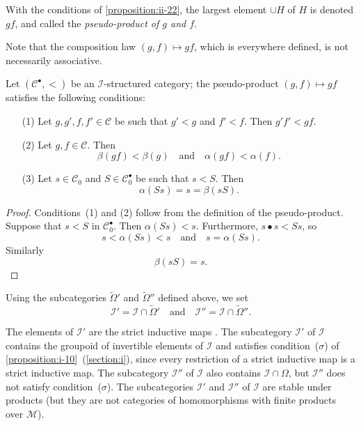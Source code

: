 \documentclass[a4paper,fleqn]{article}
\theoremstyle{plain}
\newenvironment{proposition}[1]
  {\renewcommand\theinnerproposition{#1}\innerproposition}
  {\endinnerproposition}
\theoremstyle{definition}
\newenvironment{definition}[1]
  {\renewcommand\theinnerdefinition{#1}\innerdefinition}
  {\endinnerdefinition}
\newcommand{\oldpage}[1]{{\marginpar{\footnotesize$\bigg\vert$\,\,\,\,\textit{p.~#1}}}}
\newcommand{\textand}{\quad\text{and}\quad}
\newcommand{\CC}{\mathcal{C}}
\newcommand{\MM}{\mathcal{M}}
\newcommand{\II}{\mathcal{I}}
\newcommand{\smallbullet}{\bullet}
\begin{document}
\begin{definition}{20}
\label{definition:ii-20}
  With the conditions of \cref{proposition:ii-22}, the largest element $\cup H$ of $H$ is denoted $gf$, and called the \emph{pseudo-product of $g$ and $f$}.
\end{definition}

Note that the composition law $(g,f)\mapsto gf$, which is everywhere defined, is not necessarily associative.

\begin{proposition}{23}
\label{proposition:ii-23}
  Let $(\CC^\smallbullet,<)$ be an $\II$-structured category;
  the pseudo-product $(g,f)\mapsto gf$ satisfies the following conditions:
  \begin{enumerate}
    \item[\normalfont(1)]
      Let $g,g',f,f'\in\CC$ be such that $g'<g$ and $f'<f$.
      Then $g'f'<gf$.
    \item[\normalfont(2)]
      Let $g,f\in\CC$.
      Then
      \[
        \beta(gf)<\beta(g)
        \textand
        \alpha(gf)<\alpha(f).
      \]
    \item[\normalfont(3)]
      \oldpage{405}
      Let $s\in\CC_0$ and $S\in\CC_0^\smallbullet$ be such that $s<S$.
      Then
      \[
        \alpha(Ss)
        = s
        = \beta(sS).
      \]
  \end{enumerate}
\end{proposition}

\begin{proof}
  Conditions~(1) and (2) follow from the definition of the pseudo-product.
  Suppose that $s<S$ in $\CC_0^\smallbullet$.
  Then $\alpha(Ss)<s$.
  Furthermore, $s\smallbullet s<Ss$, so
  \[
    s < \alpha(Ss) < s
    \textand
    s = \alpha(Ss).
  \]
  Similarly
  \[
    \beta(sS)
    = s.
  \]
\end{proof}

Using the subcategories $\widetilde{\Omega}'$ and $\widetilde{\Omega}''$ defined above, we set
\[
  \II' = \II\cap\widetilde{\Omega}'
  \textand
  \II'' = \II\cap\widetilde{\Omega}''.
\]

The elements of $\II'$ are the strict inductive maps \cite{3a}.
The subcategory $\II'$ of $\II$ contains the groupoid of invertible elements of $\II$ and satisfies condition~($\sigma$) of \cref{proposition:i-10}~(\cref{section:i}), since every restriction of a strict inductive map is a strict inductive map.
The subcategory $\II''$ of $\II$ also contains $\II\cap\Omega$, but $\II''$ does not satisfy condition~($\sigma$).
The subcategories $\II'$ and $\II''$ of $\II$ are stable under products (but they are not categories of homomorphisms with finite products over $\MM$).
\end{document}
